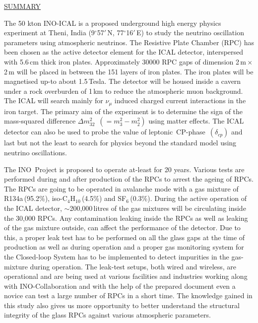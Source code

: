 \begin{center}
  \large
  \underline{SUMMARY}
\end{center}

\normalsize

\doublespacing

The 50 kton INO-ICAL \cite{inowhite} is a proposed underground high
energy physics experiment at Theni, India (9$^\circ$57$'$\,N,
77$^\circ$16$'$\,E) to study the neutrino oscillation parameters using
atmospheric neutrinos. The Resistive Plate Chamber (RPC) has been
chosen as the active detector element for the ICAL detector,
interspersed with 5.6\,cm thick iron plates. Approximately 30000 RPC
gaps of dimension 2\,m\,$\times$\,2\,m will be placed in between the
151 layers of iron plates. The iron plates will be magnetised up-to
about 1.5\,Tesla. The detector will be housed inside a cavern under a
rock overburden of 1\,km to reduce the atmospheric muon background.
The ICAL will search mainly for $\nu_{\mu}$ induced charged current
interactions in the iron target. The primary aim of the experiment is
to determine the sign of the mass-squared difference
\mbox{$\Delta m^2_{32}$ $\left(=m^2_3-m^2_2\right)$} using matter
effects. The ICAL detector can also be used to probe the value of
\mbox{leptonic CP-phase $\left(\delta_{cp}\right)$} and last but not
the least to search for physics beyond the standard model using
neutrino oscillations. 

The INO~Project is proposed to operate at-least for 20 years.
Various tests are performed during and after production of the RPCs to
arrest the ageing of RPCs.
The RPCs are going to be operated in avalanche mode with
a gas mixture of R134a\,(95.2\%), iso-C$_4$H$_{10}$\,(4.5\%) and
SF$_6$\,(0.3\%).
During the active operation of the ICAL detector, $\sim$200,000\,litres
of the gas mixtures will be circulating inside
the 30,000 RPCs.
Any contamination leaking inside the RPCs as well as leaking of the
gas mixture outside, can affect the performance of the detector.
Due to this, a
proper leak test has to be performed on all the glass gaps at the time
of production as well as during operation and a proper gas monitoring
system for the Closed-loop System has to be implemented to detect
impurities in the gas-mixture during operation.
The leak-test setups, both wired and wireless, are operational and are
being used at various facilities and industries working along with
INO-Collaboration and with the help of the prepared document even a
novice can test a large number of RPCs in a short time. The knowledge
gained in this study also gives us more opportunity to better
understand the structural integrity of the glass RPCs against various
atmospheric parameters.


